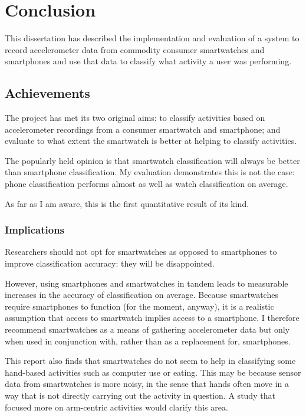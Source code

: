 \chapter{Conclusion}
  This dissertation has described the implementation and evaluation of a system to record accelerometer data from commodity consumer smartwatches and smartphones and use that data to classify what activity a user was performing.
  
  \section{Achievements}
    The project has met its two original aims: to classify activities based on accelerometer recordings from a consumer smartwatch and smartphone; and evaluate to what extent the smartwatch is better at helping to classify activities.
    
    The popularly held opinion is that smartwatch classification will always be better than smartphone classification. My evaluation demonstrates this is not the case: phone classification performs almost as well as watch classification on average.
    
    As far as I am aware, this is the first quantitative result of its kind.
    
    \subsection{Implications}
      Researchers should not opt for smartwatches as opposed to smartphones to improve classification accuracy: they will be disappointed.
      
      However, using smartphones and smartwatches in tandem leads to measurable increases in the accuracy of classification on average. Because smartwatches require smartphones to function (for the moment, anyway), it is a realistic assumption that access to smartwatch implies access to a smartphone. I therefore recommend smartwatches as a means of gathering accelerometer data but only when used in conjunction with, rather than as a replacement for, smartphones.
      
      This report also finds that smartwatches do not seem to help in classifying some hand-based activities such as computer use or eating. This may be because sensor data from smartwatches is more noisy, in the sense that hands often move in a way that is not directly carrying out the activity in question. A study that focused more on arm-centric activities would clarify this area.
    
